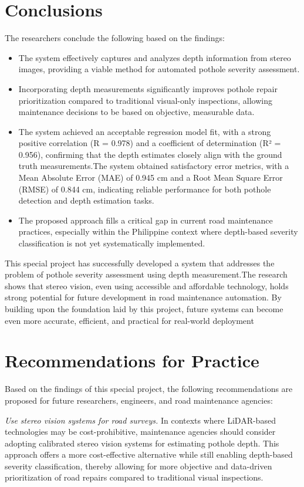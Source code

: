 \section{Conclusions}
The researchers conclude the following based on the findings:

\begin{itemize}
	\item The system effectively captures and analyzes depth information from stereo images, providing a viable method for automated pothole severity assessment.
	
	\item Incorporating depth measurements significantly improves pothole repair prioritization compared to traditional visual-only inspections, allowing maintenance decisions to be based on objective, measurable data.
	\item The system achieved an acceptable regression model fit, with a strong positive correlation (R = 0.978) and a coefficient of determination (R² = 0.956), confirming that the depth estimates closely align with the ground truth measurements.The system obtained satisfactory error metrics, with a Mean Absolute Error (MAE) of 0.945 cm and a Root Mean Square Error (RMSE) of 0.844 cm, indicating reliable performance for both pothole detection and depth estimation tasks.
	\item The proposed approach fills a critical gap in current road maintenance practices, especially within the Philippine context where depth-based severity classification is not yet systematically implemented.
\end{itemize}

This special project has successfully developed a system that addresses the problem of pothole severity assessment using depth measurement.The research shows that stereo vision, even using accessible and affordable technology, holds strong potential for future development in road maintenance automation. By building upon the foundation laid by this project, future systems can become even more accurate, efficient, and practical for real-world deployment

\section{Recommendations for Practice}
Based on the findings of this special project, the following recommendations are proposed for future researchers, engineers, and road maintenance agencies:

\textit{Use stereo vision systems for road surveys.} In contexts where LiDAR-based technologies may be cost-prohibitive, maintenance agencies should consider adopting calibrated stereo vision systems for estimating pothole depth. This approach offers a more cost-effective alternative while still enabling depth-based severity classification, thereby allowing for more objective and data-driven prioritization of road repairs compared to traditional visual inspections.

